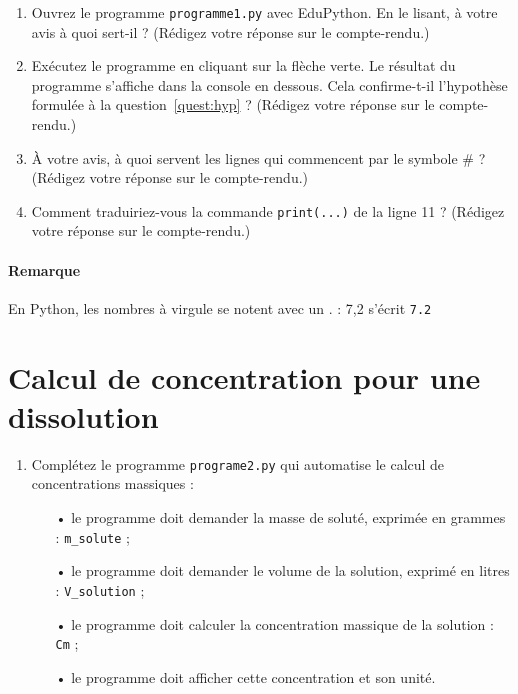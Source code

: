 \begin{enumerate}
\item \anarai{} Ouvrez le programme \texttt{programme1.py} avec EduPython.
En le lisant, à votre avis à quoi sert-il ?
(Rédigez votre réponse sur le compte-rendu.)
\label{quest:hyp}

\item \rea{} \val{} Exécutez le programme en cliquant sur la flèche verte.
Le résultat du programme s'affiche dans la console  en dessous.
Cela confirme-t-il l'hypothèse formulée à la question~\ref{quest:hyp} ?
(Rédigez votre réponse sur le compte-rendu.)

\item \anarai{} À votre avis, à quoi servent les lignes qui commencent par le symbole \# ?
(Rédigez votre réponse sur le compte-rendu.)

\item \app{} Comment traduiriez-vous  la commande \texttt{print(...)} de la ligne 11 ?
(Rédigez votre réponse sur le compte-rendu.)
\end{enumerate}

\paragraph*{Remarque} En Python, les nombres à virgule se notent avec un \og . \fg{} : 7{,}2 s'écrit \texttt{7{.}2}

\section*{Calcul de concentration pour une dissolution}

\begin{enumerate}[resume]
\item \anarai{} \com{} Complétez le programme \texttt{programe2.py} qui automatise le calcul de concentrations massiques :
\begin{itemize}
\item[•] le programme doit demander la masse de soluté, exprimée en grammes : \texttt{m\_solute} ;
\item[•] le programme doit demander le volume de la solution, exprimé en litres : \texttt{V\_solution} ;
\item[•] le programme doit calculer la concentration massique de la solution : \texttt{Cm} ;
\item[•] le programme doit afficher cette concentration et son unité.
\end{itemize}
\end{enumerate}

